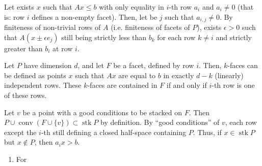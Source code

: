 \documentclass[11pt]{amsart}
\DeclareMathOperator{\conv}{conv}
\DeclareMathOperator{\stack}{stk}
\begin{document}
\begin{enumerate}
       Let exists $x$ such that $Ax \leq b$ with only equality in $i$-th row $a_i$ and $a_i\neq 0$ (that is: row $i$ defines a non-empty facet). Then, let be $j$ such that $a_{i,j}\neq 0$. By finiteness of non-trivial rows of $A$ (i.e. finiteness of facets of $P$), exists $\epsilon >0$ such that $A(x\pm\epsilon e_j)$ still being strictly less than $b_k$ for each row $k\neq i$ and strictly greater than $b_i$ at row $i$.
       
       Let $P$ have dimension $d$, and let $F$ be a facet, defined by row $i$. Then, $k$-faces can be defined as points $x$ such that $Ax$ are equal to $b$ in exactly $d-k$ (linearly) independent rows. These $k$-faces are contained in $F$ if and only if $i$-th row is one of these rows.
       
       Let $v$ be a point with a good conditions to be stacked on $F$. Then $P \cup \conv(F\cup \{v\}) \subset \stack P$ by definition. By ``good conditions'' of $v$, each row except the $i$-th still defining a closed half-space containing $P$. Thus, if $x\in \stack{P}$ but $x\notin P$, then $a_ix>b$.
       
       \begin{enumerate}
         \item For
       \end{enumerate}
       
     \end{enumerate}
  
\end{document}
